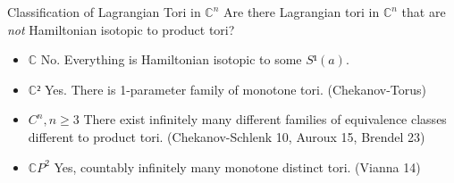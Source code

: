 \documentclass[aspectratio=169,handout]{beamer}
\begin{document}
\begin{frame}{Classification of Lagrangian Tori in $ℂ^n$}
  Are there Lagrangian tori in $ℂ^n$ that are \emph{not} Hamiltonian isotopic to product tori?

  \begin{itemize}
    \item<2-> $ℂ$ No. Everything is Hamiltonian isotopic to some $S¹(a)$.
    
    \item<3-> $ℂ²$ Yes. There is 1-parameter family of monotone tori. (Chekanov-Torus)
    
    \item<4-> $C^n, n ≥ 3$ There exist infinitely many different families of equivalence classes different to product tori. (Chekanov-Schlenk 10, Auroux 15, Brendel 23)
    
    \item<5-> $ℂP^2$ Yes, countably infinitely many monotone distinct tori. (Vianna 14)
  \end{itemize}
\end{frame}
\end{document}
